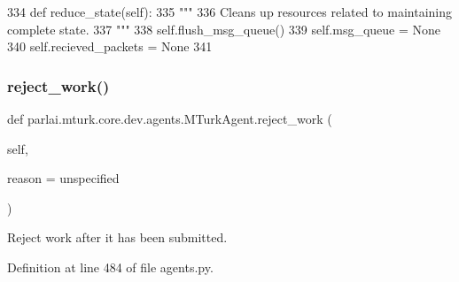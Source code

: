 \begin{DoxyCode}
334     \textcolor{keyword}{def }reduce\_state(self):
335         \textcolor{stringliteral}{"""}
336 \textcolor{stringliteral}{        Cleans up resources related to maintaining complete state.}
337 \textcolor{stringliteral}{        """}
338         self.flush\_msg\_queue()
339         self.msg\_queue = \textcolor{keywordtype}{None}
340         self.recieved\_packets = \textcolor{keywordtype}{None}
341 
\end{DoxyCode}
\mbox{\label{classparlai_1_1mturk_1_1core_1_1dev_1_1agents_1_1MTurkAgent_a5f3d74f332376039cd349ab7159e0b4c}} 
\subsubsection{\texorpdfstring{reject\+\_\+work()}{reject\_work()}}
{\footnotesize\ttfamily def parlai.\+mturk.\+core.\+dev.\+agents.\+M\+Turk\+Agent.\+reject\+\_\+work (\begin{DoxyParamCaption}\item[{}]{self,  }\item[{}]{reason = {\ttfamily \textquotesingle{}unspecified\textquotesingle{}} }\end{DoxyParamCaption})}

\begin{DoxyVerb}Reject work after it has been submitted.
\end{DoxyVerb}
 

Definition at line 484 of file agents.\+py.



